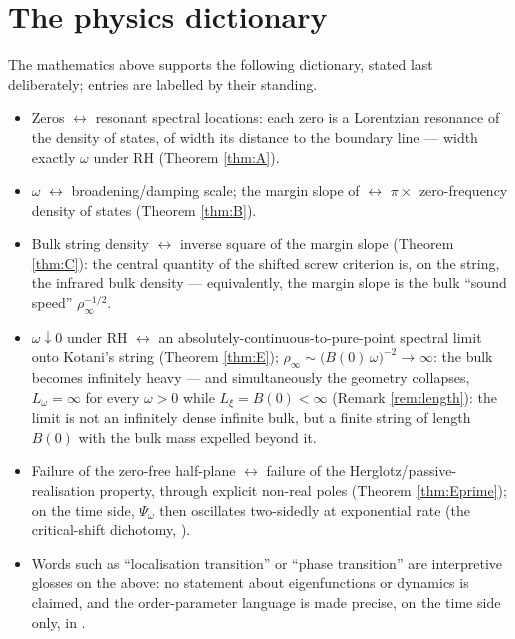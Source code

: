 \documentclass[11pt,reqno]{amsart}
\theoremstyle{plain}
\theoremstyle{definition}
\begin{document}
\section{The physics dictionary}\label{sec:physics}

The mathematics above supports the following dictionary, stated last deliberately; entries are
labelled by their standing.

\begin{itemize}
\item[\emph{(thm)}] Zeros $\leftrightarrow$ resonant spectral locations: each zero is a
Lorentzian resonance of the density of states, of width its distance to the boundary line ---
width exactly $\omega$ under RH (Theorem \ref{thm:A}).
\item[\emph{(thm)}] $\omega$ $\leftrightarrow$ broadening/damping scale; the margin slope of
\cite{Margin} $\leftrightarrow$ $\pi\times$ zero-frequency density of states (Theorem
\ref{thm:B}).
\item[\emph{(thm)}] Bulk string density $\leftrightarrow$ inverse square of the margin slope
(Theorem \ref{thm:C}): the central quantity of the shifted screw criterion is, on the string,
the infrared bulk density --- equivalently, the margin slope is the bulk ``sound speed''
$\rho_\infty^{-1/2}$.
\item[\emph{(thm)}] $\omega\downarrow0$ under RH $\leftrightarrow$ an
absolutely-continuous-to-pure-point spectral limit onto Kotani's string (Theorem \ref{thm:E});
$\rho_\infty\sim\bigl(B(0)\,\omega\bigr)^{-2}\to\infty$: the bulk becomes infinitely heavy ---
and simultaneously the geometry collapses, $L_\omega=\infty$ for every $\omega>0$ while
$L_\xi=B(0)<\infty$ (Remark \ref{rem:length}): the limit is not an infinitely dense infinite
bulk, but a finite string of length $B(0)$ with the bulk mass expelled beyond it.
\item[\emph{(thm)}] Failure of the zero-free half-plane $\leftrightarrow$ failure of the
Herglotz/passive-realisation property, through explicit non-real poles (Theorem
\ref{thm:Eprime}); on the time side, $\Psi_\omega$ then oscillates two-sidedly at exponential
rate (the critical-shift dichotomy, \cite[Thm.~3.4]{Margin}).
\item[\emph{(gloss)}] Words such as ``localisation transition'' or ``phase transition'' are
interpretive glosses on the above: no statement about eigenfunctions or dynamics is claimed,
and the order-parameter language is made precise, on the time side only, in \cite{Margin}.
\end{itemize}
\end{document}
